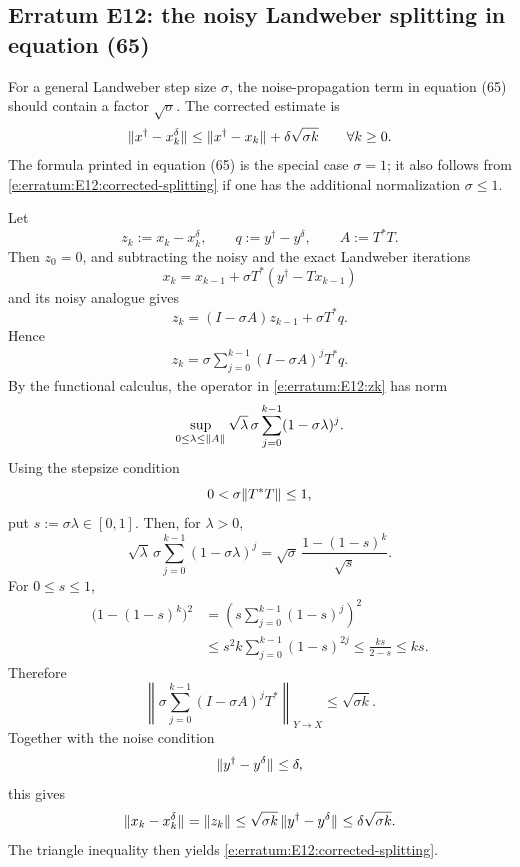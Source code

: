 
\subsection*{Erratum E12: the noisy Landweber splitting in equation (65)}
\label{s:erratum:E12}

For a general Landweber step size $\sigma$, the noise-propagation term in
equation (65) should contain a factor $\sqrt{\sigma}$.  The corrected
estimate is
\begin{align}
\label{e:erratum:E12:corrected-splitting}
        \| x^\dag - x_k^\delta \|_{  }
        \leq
        \| x^\dag - x_k \|_{  }
        +
        \delta \sqrt{\sigma k}
        \qquad
        \forall k \geq 0 .
\end{align}
The formula printed in equation (65) is the special case $\sigma=1$; it
also follows from \eqref{e:erratum:E12:corrected-splitting} if one has the
additional normalization $\sigma\leq1$.

Let
\[
        z_k := x_k - x_k^\delta,
        \qquad
        q := y^\dag-y^\delta,
        \qquad
        A:=T^*T .
\]
Then $z_0=0$, and subtracting the noisy and the exact Landweber iterations
\[
        x_k=x_{k-1}+\sigma T^*(y^\dag-Tx_{k-1})
\]
and its noisy analogue gives
\[
        z_k
        =
        (I-\sigma A)z_{k-1}+\sigma T^*q .
\]
Hence
\begin{align}
\label{e:erratum:E12:zk}
        z_k
        =
        \sigma \sum_{j=0}^{k-1}
        (I-\sigma A)^j T^*q .
\end{align}
By the functional calculus, the operator in
\eqref{e:erratum:E12:zk} has norm
\[
        \sup_{0\leq \lambda\leq \| A \|_{  }}
        \sqrt{\lambda}\,
        \sigma\sum_{j=0}^{k-1}(1-\sigma\lambda)^j .
\]
Using the stepsize condition
\[
        0<\sigma \| T^*T \|_{  }\le 1,
\]
put $s:=\sigma\lambda\in[0,1]$.  Then, for
$\lambda>0$,
\[
        \sqrt{\lambda}\,
        \sigma\sum_{j=0}^{k-1}(1-\sigma\lambda)^j
        =
        \sqrt{\sigma}\,
        \frac{1-(1-s)^k}{\sqrt{s}} .
\]
For $0\leq s\leq1$,
\begin{align*}
        \bigl(1-(1-s)^k\bigr)^2
        &=
        \left(
                s\sum_{j=0}^{k-1}(1-s)^j
        \right)^2
        \\
        &\leq
        s^2 k\sum_{j=0}^{k-1}(1-s)^{2j}
        \leq
        \frac{k s}{2-s}
        \leq
        k s .
\end{align*}
Therefore
\[
        \left\|
        \sigma \sum_{j=0}^{k-1}(I-\sigma A)^j T^*
        \right\|_{Y\to X}
        \leq
        \sqrt{\sigma k} .
\]
Together with the noise condition
\[
        \|  y^\dag - y^\delta  \|_{  } \le \delta,
\]
this gives
\[
        \| x_k-x_k^\delta \|_{  }
        =
        \| z_k \|_{  }
        \leq
        \sqrt{\sigma k}\,\| y^\dag-y^\delta \|_{  }
        \leq
        \delta\sqrt{\sigma k} .
\]
The triangle inequality then yields
\eqref{e:erratum:E12:corrected-splitting}.

